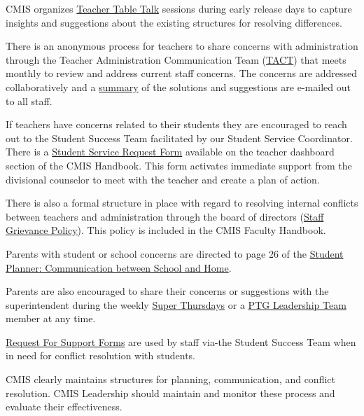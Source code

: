\begin{findings}

CMIS organizes \href{https://drive.google.com/a/cmis.ac.th/file/d/0ByVFfrm0zfolWUs2RGMxczFXRXRqbDRjRlF2SGQ5cVZfV0FZ/view?usp=sharing}{Teacher Table Talk} sessions during early release days to capture insights and suggestions about the existing structures for resolving differences.

There is an anonymous process for teachers to share concerns with administration through the Teacher Administration Communication Team (\href{https://docs.google.com/a/cmis.ac.th/document/d/14nhwcw8xo3i-23Q-WUxo6KJ_c8yFKu-jTdCctt4MFcs/edit?usp=sharing}{TACT}) that meets monthly to review and address current staff concerns. The concerns are addressed collaboratively and a \href{https://docs.google.com/a/cmis.ac.th/document/d/1KLB4c5_LkxXzq4vP2EuNhBVPp2q_FT9qy1cBBwaS5JM/edit?usp=sharing}{summary} of the solutions and suggestions are e-mailed out to all staff.

If teachers have concerns related to their students they are encouraged to reach out to the Student Success Team facilitated by our Student Service Coordinator. There is a \href{https://docs.google.com/a/cmis.ac.th/forms/d/e/1FAIpQLScVtFtaEXarGOjwsiJyGdbLAMbeNzG9m44i1fWXFLbtMKZcUg/viewform}{Student Service Request Form} available on the teacher dashboard section of the CMIS Handbook. This form activates immediate support from the divisional counselor to meet with the teacher and create a plan of action.

There is also a formal structure in place with regard to resolving internal conflicts between teachers and administration through the board of directors (\href{https://docs.google.com/a/cmis.ac.th/document/d/1RRBuWgqIb-BlwD8vTRrTG0u_FCHgQFD_oEbvseNdAPc/edit?usp=sharing}{Staff Grievance Policy}). This policy is included in the CMIS Faculty Handbook.

Parents with student or school concerns are directed to page 26 of the \href{https://docs.google.com/document/d/1bIbV9pgGz2vpXYJdnRzL_Od5PS35egy7lgBOBuszgD4/edit}{Student Planner: Communication between School and Home}. 

Parents are also encouraged to share their concerns or suggestions with the superintendent during the weekly \href{http://blogs.cmis.ac.th/newsletter/2016/09/05/super-thursdays-starts-this-week/}{Super Thursdays} or a \href{http://blogs.cmis.ac.th/ptg/about/}{PTG Leadership Team} member at any time. 

\href{https://docs.google.com/a/cmis.ac.th/forms/d/e/1FAIpQLScVtFtaEXarGOjwsiJyGdbLAMbeNzG9m44i1fWXFLbtMKZcUg/viewform}{Request For Support Forms} are used by staff via-the Student Success Team when in need for conflict resolution with students.


CMIS clearly maintains structures for planning, communication, and conflict resolution. CMIS Leadership should maintain and monitor these process and evaluate their effectiveness. 

\end{findings}

